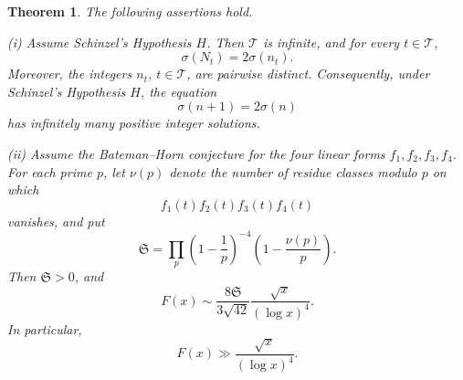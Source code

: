 \documentclass[11pt,reqno]{amsart}
\numberwithin{equation}{section}
\theoremstyle{plain}
\newtheorem{theorem}{Theorem}[section]
\theoremstyle{definition}
\theoremstyle{remark}
\begin{document}
\begin{theorem}\label{thm:conditional-family}
The following assertions hold.

\textup{(i)} Assume Schinzel's Hypothesis $H$. Then $\mathcal T$ is infinite, and for every $t\in\mathcal T$,
\[
\sigma(N_t)=2\sigma(n_t).
\]
Moreover, the integers $n_t$, $t\in\mathcal T$, are pairwise distinct. Consequently, under Schinzel's Hypothesis $H$, the equation
\[
\sigma(n+1)=2\sigma(n)
\]
has infinitely many positive integer solutions.

\textup{(ii)} Assume the Bateman--Horn conjecture for the four linear forms $f_1,f_2,f_3,f_4$. For each prime $p$, let $\nu(p)$ denote the number of residue classes modulo $p$ on which
\[
f_1(t)f_2(t)f_3(t)f_4(t)
\]
vanishes, and put
\[
\mathfrak S
=
\prod_p\left(1-\frac1p\right)^{-4}\left(1-\frac{\nu(p)}p\right).
\]
Then $\mathfrak S>0$, and
\[
F(x)
\sim
\frac{8\mathfrak S}{3\sqrt{42}}
\frac{\sqrt{x}}{(\log x)^4}.
\]
In particular,
\[
F(x)\gg\frac{\sqrt{x}}{(\log x)^4}.
\]
\end{theorem}
\end{document}
